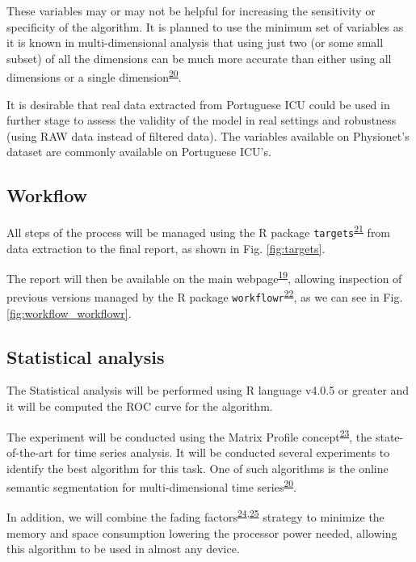 \documentclass[12pt,twoside]{fmupthesis}
\begin{document}
These variables may or may not be helpful for increasing the sensitivity or specificity of the algorithm. It is planned
to use the minimum set of variables as it is known in multi-dimensional analysis that using just two (or some small
subset) of all the dimensions can be much more accurate than either using all dimensions or a single
dimension\textsuperscript{\protect\hyperlink{ref-gharghabi2018}{20}}.

It is desirable that real data extracted from Portuguese ICU could be used in further stage to assess the validity of
the model in real settings and robustness (using RAW data instead of filtered data). The variables available on
Physionet's dataset are commonly available on Portuguese ICU's.

\hypertarget{workflow}{%
\subsection{Workflow}\label{workflow}}

All steps of the process will be managed using the R package \texttt{targets}\textsuperscript{\protect\hyperlink{ref-landau2021}{21}} from data extraction to the final
report, as shown in Fig. \ref{fig:targets}.

The report will then be available on the main webpage\textsuperscript{\protect\hyperlink{ref-franz_website}{19}}, allowing inspection of previous versions managed
by the R package \texttt{workflowr}\textsuperscript{\protect\hyperlink{ref-workflowr2021}{22}}, as we can see in Fig. \ref{fig:workflow_workflowr}.

\hypertarget{statistical-analysis}{%
\subsection{Statistical analysis}\label{statistical-analysis}}

The Statistical analysis will be performed using R language v4.0.5 or greater and it will be computed the ROC curve for
the algorithm.

The experiment will be conducted using the Matrix Profile concept\textsuperscript{\protect\hyperlink{ref-yeh2016}{23}}, the state-of-the-art for time series
analysis. It will be conducted several experiments to identify the best algorithm for this task. One of such algorithms
is the online semantic segmentation for multi-dimensional time series\textsuperscript{\protect\hyperlink{ref-gharghabi2018}{20}}.

In addition, we will combine the fading factors\textsuperscript{\protect\hyperlink{ref-Gama2013}{24},\protect\hyperlink{ref-Rodrigues2010}{25}} strategy to minimize the memory and space
consumption lowering the processor power needed, allowing this algorithm to be used in almost any device.
\end{document}
